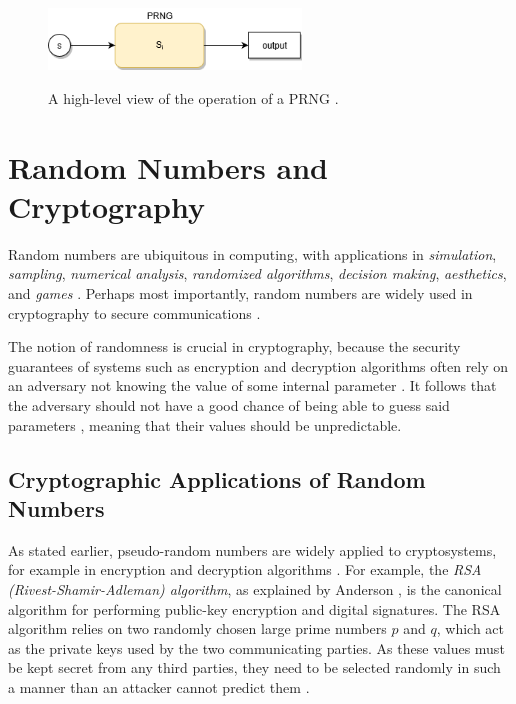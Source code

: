 \documentclass[12pt, titlepage]{report}
\theoremstyle{definition}
\begin{document}
\begin{figure}
\centering
\includegraphics[width=0.6\textwidth]{img/conceptual_prng.png}\\
\caption{A high-level view of the operation of a PRNG \cite{kelsey1998cryptanalytic}.}
\label{figure:prng_high_level}
\end{figure}



\section{Random Numbers and Cryptography}
Random numbers are ubiquitous in computing, with applications in \emph{simulation}, \emph{sampling}, \emph{numerical analysis}, \emph{randomized algorithms}, \emph{decision making}, \emph{aesthetics}, and \emph{games} \cite[p. 1-2]{donald1998art}. Perhaps most importantly, random numbers are widely used in cryptography to secure communications \cite[p. 137]{ferguson2010cryptography}.

The notion of randomness is crucial in cryptography, because the security guarantees of systems such as encryption and decryption algorithms often rely on an adversary not knowing the value of some internal parameter \cite[p. 169]{menezes1996handbook} \cite[p. 1]{kelsey1998cryptanalytic}. It follows that the adversary should not have a good chance of being able to guess said parameters \cite[p. 2]{kelsey1998cryptanalytic}, meaning that their values should be unpredictable.


\subsection{Cryptographic Applications of Random Numbers}
As stated earlier, pseudo-random numbers are widely applied to cryptosystems, for example in encryption and decryption algorithms \cite[p. 169]{menezes1996handbook}. For example, the \emph{RSA (Rivest-Shamir-Adleman) algorithm}, as explained by Anderson \cite{anderson2010security}, is the canonical algorithm for performing public-key encryption and digital signatures. The RSA algorithm relies on two randomly chosen large prime numbers $p$ and $q$, which act as the private keys used by the two communicating parties. As these values must be kept secret from any third parties, they need to be selected randomly in such a manner than an attacker cannot predict them \cite[p. 171]{anderson2010security}.
\end{document}
